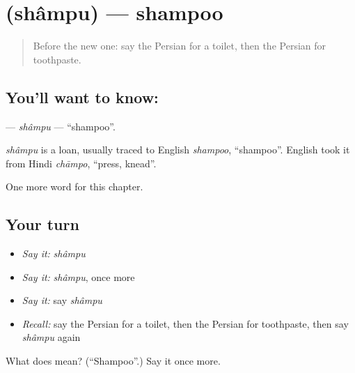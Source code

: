 \section[\texorpdfstring{\fa{شامپو} (shâmpu)}{شامپو (shâmpu)}]{ (shâmpu) — shampoo}

\label{lesson:FA-C165-shampu}



\begin{quote}
Before the new one: say the Persian for a toilet, then the Persian for toothpaste.
\end{quote}

\subsection*{You'll want to know: }
\textbf{} — \emph{shâmpu} — \textquotedblleft{}shampoo\textquotedblright{}.

\begin{cousinweb}
\emph{shâmpu} is a loan, usually traced to English \emph{shampoo}, \textquotedblleft{}shampoo\textquotedblright{}. English took it from Hindi \emph{chāmpo}, \textquotedblleft{}press, knead\textquotedblright{}.
\end{cousinweb}

\begin{grammarlens}[title={What you've built}]
One more word for this chapter.
\end{grammarlens}

\subsection*{Your turn}
\begin{itemize}
\raggedright
  \item \emph{Say it:} \emph{shâmpu}
  \item \emph{Say it:} \emph{shâmpu}, once more
  \item \emph{Say it:} say \emph{shâmpu}
  \item \emph{Recall:} say the Persian for a toilet, then the Persian for toothpaste, then say \emph{shâmpu} again
\end{itemize}

\begin{tcolorbox}[breakable,colback=teal!4,colframe=teal!35!black,title={Before you move on}]
What does  mean? (\textquotedblleft{}Shampoo\textquotedblright{}.) Say it once more.
\end{tcolorbox}
